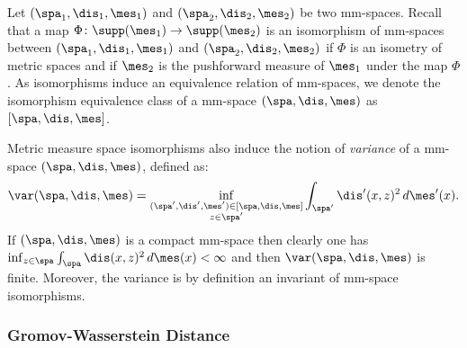 Let $(\spa_1,\dis_1,\mes_1)$ and $(\spa_2,\dis_2,\mes_2)$ be two mm-spaces. Recall that a map $\Phi\colon\supp(\mes_1)\rightarrow\supp(\mes_2)$ is an isomorphism of mm-spaces between $(\spa_1,\dis_1,\mes_1)$ and $(\spa_2,\dis_2,\mes_2)$ if $\Phi$ is an isometry of metric spaces
    and if $\mes_2$ is the pushforward measure of $\mes_1$ under the map $\Phi$.
As isomorphisms induce an equivalence relation of mm-spaces, we denote the isomorphism equivalence class of a mm-space $(\spa,\dis,\mes)$ as $[\spa,\dis,\mes]$.




Metric measure space isomorphisms also induce the notion of {\it variance} of a mm-space $(\spa,\dis,\mes)$, defined as:
$$\var(\spa,\dis,\mes)=\inf_{\substack{(\spa',\dis',\mes')\in [\spa,\dis,\mes]\\ z\in \spa'}}\int_{\spa'}\dis'(x,z)^2\,d\mes'(x).$$
If $(\spa,\dis,\mes)$ is a compact mm-space then clearly one has $\inf_{z\in \spa}\int_{\spa}\dis(x,z)^2\,d\mes(x) < \infty $ and then $\var(\spa,\dis,\mes)$ is finite. Moreover, the variance is by definition an invariant of mm-space isomorphisms.

 




\subsubsection{Gromov-Wasserstein Distance}

